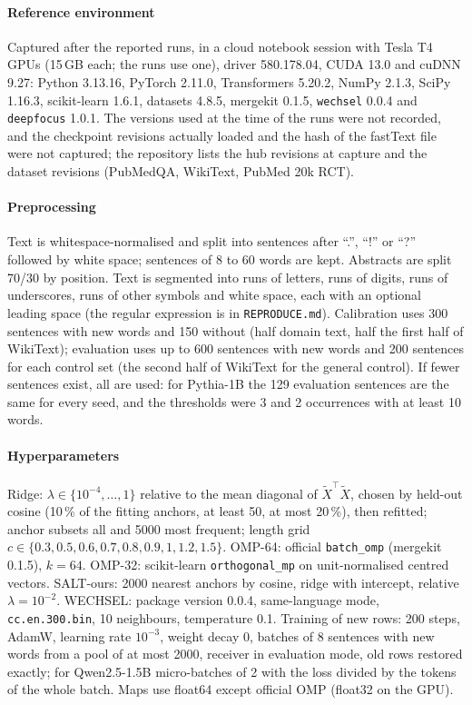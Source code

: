 \documentclass[preprint,12pt]{elsarticle}
\begin{document}
\paragraph{Reference environment} Captured after the reported runs, in a cloud notebook session with Tesla T4 GPUs (15\,GB each; the runs use one), driver 580.178.04, CUDA 13.0 and cuDNN 9.27: Python 3.13.16, PyTorch 2.11.0, Transformers 5.20.2, NumPy 2.1.3, SciPy 1.16.3, scikit-learn 1.6.1, datasets 4.8.5, mergekit 0.1.5, \texttt{wechsel} 0.0.4 and \texttt{deepfocus} 1.0.1. The versions used at the time of the runs were not recorded, and the checkpoint revisions actually loaded and the hash of the fastText file were not captured; the repository lists the hub revisions at capture and the dataset revisions (PubMedQA, WikiText, PubMed 20k RCT).

\paragraph{Preprocessing} Text is whitespace-normalised and split into sentences after ``.'', ``!'' or ``?'' followed by white space; sentences of 8 to 60 words are kept. Abstracts are split 70/30 by position. Text is segmented into runs of letters, runs of digits, runs of underscores, runs of other symbols and white space, each with an optional leading space (the regular expression is in \texttt{REPRODUCE.md}). Calibration uses 300 sentences with new words and 150 without (half domain text, half the first half of WikiText); evaluation uses up to 600 sentences with new words and 200 sentences for each control set (the second half of WikiText for the general control). If fewer sentences exist, all are used: for Pythia-1B the 129 evaluation sentences are the same for every seed, and the thresholds were 3 and 2 occurrences with at least 10 words.

\paragraph{Hyperparameters} Ridge: $\lambda\in\{10^{-4},\dots,1\}$ relative to the mean diagonal of $\tilde X^\top\tilde X$, chosen by held-out cosine (10\,\% of the fitting anchors, at least 50, at most 20\,\%), then refitted; anchor subsets all and 5000 most frequent; length grid $c\in\{0.3,0.5,0.6,0.7,0.8,0.9,1,1.2,1.5\}$. OMP-64: official \texttt{batch\_omp} (mergekit 0.1.5), $k=64$. OMP-32: scikit-learn \texttt{orthogonal\_mp} on unit-normalised centred vectors. SALT-ours: 2000 nearest anchors by cosine, ridge with intercept, relative $\lambda=10^{-2}$. WECHSEL: package version 0.0.4, same-language mode, \texttt{cc.en.300.bin}, 10 neighbours, temperature 0.1. Training of new rows: 200 steps, AdamW, learning rate $10^{-3}$, weight decay 0, batches of 8 sentences with new words from a pool of at most 2000, receiver in evaluation mode, old rows restored exactly; for Qwen2.5-1.5B micro-batches of 2 with the loss divided by the tokens of the whole batch. Maps use float64 except official OMP (float32 on the GPU).
\end{document}
